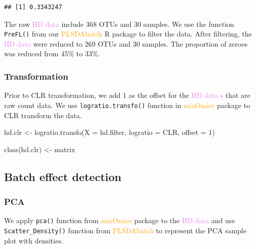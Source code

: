 \documentclass[
]{book}
\newenvironment{Shaded}{\begin{snugshade}}{\end{snugshade}}
\newcommand{\AttributeTok}[1]{\textcolor[rgb]{0.77,0.63,0.00}{#1}}
\newcommand{\DecValTok}[1]{\textcolor[rgb]{0.00,0.00,0.81}{#1}}
\newcommand{\FunctionTok}[1]{\textcolor[rgb]{0.00,0.00,0.00}{#1}}
\newcommand{\NormalTok}[1]{#1}
\newcommand{\OtherTok}[1]{\textcolor[rgb]{0.56,0.35,0.01}{#1}}
\newcommand{\StringTok}[1]{\textcolor[rgb]{0.31,0.60,0.02}{#1}}
\begin{document}
\begin{verbatim}
## [1] 0.3343247
\end{verbatim}

The raw \textcolor{violet}{HD data} include 368 OTUs and 30 samples. We use the function \texttt{PreFL()} from our \textcolor{orange}{PLSDAbatch} R package to filter the data. After filtering, the \textcolor{violet}{HD data} were reduced to 269 OTUs and 30 samples. The proportion of zeroes was reduced from 45\% to 33\%.

\hypertarget{transformation-3}{%
\subsubsection{Transformation}\label{transformation-3}}

Prior to CLR transformation, we add 1 as the offset for the \textcolor{violet}{HD data} - that are raw count data. We use \texttt{logratio.transfo()} function in \textcolor{orange}{mixOmics} package to CLR transform the data.

\begin{Shaded}
\begin{Highlighting}[]
\NormalTok{hd.clr }\OtherTok{\textless{}{-}} \FunctionTok{logratio.transfo}\NormalTok{(}\AttributeTok{X =}\NormalTok{ hd.filter, }\AttributeTok{logratio =} \StringTok{\textquotesingle{}CLR\textquotesingle{}}\NormalTok{, }\AttributeTok{offset =} \DecValTok{1}\NormalTok{)}

\FunctionTok{class}\NormalTok{(hd.clr) }\OtherTok{\textless{}{-}} \StringTok{\textquotesingle{}matrix\textquotesingle{}}
\end{Highlighting}
\end{Shaded}

\hypertarget{batch-effect-detection-3}{%
\subsection{Batch effect detection}\label{batch-effect-detection-3}}

\hypertarget{pca-3}{%
\subsubsection{PCA}\label{pca-3}}

We apply \texttt{pca()} function from \textcolor{orange}{mixOmics} package to the \textcolor{violet}{HD data} and use \texttt{Scatter\_Density()} function from \textcolor{orange}{PLSDAbatch} to represent the PCA sample plot with densities.
\end{document}
